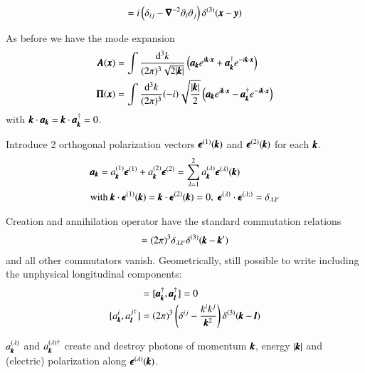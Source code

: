 \begin{align}
	[A_i(\pmb{x}), \Pi_j(\pmb{y})] = i \left( \delta_{ij} - \vecnab^{-2}\partial_i \partial_j \right) \delta^{(3)} (\pmb{x} - \pmb{y})
\end{align}

As before we have the mode expansion
\begin{align*}
	\pmb{A}(\pmb{x}) &= \int \frac{\dd^3 k}{(2\pi)^3\sqrt{2|\pmb{k}|}} \left( \pmb{a}_{\pmb{k}}e^{i\pmb{k}\cdot\pmb{x}} + \pmb{a}^\dagger_{\pmb{k}} e^{-i\pmb{k}\cdot\pmb{x}} \right) \\
	\pmb{\Pi}(\pmb{x}) &= \int \frac{\dd^3 k}{(2\pi)^3} (-i)\sqrt{\frac{|\pmb{k}|}{2}}\left( \pmb{a}_{\pmb{k}}e^{i\pmb{k}\cdot\pmb{x}} - \pmb{a}^\dagger_{\pmb{k}} e^{-i\pmb{k}\cdot\pmb{x}} \right) \\
\end{align*}
with $\pmb{k}\cdot\pmb{a}_{\pmb{k}} = \pmb{k}\cdot\pmb{a}^\dagger_{\pmb{k}} = 0$.

Introduce 2 orthogonal polarization vectors $\pmb{\epsilon}^{(1)}(\pmb{k})$ and $\pmb{\epsilon}^{(2)}(\pmb{k})$ for each $\pmb{k}$.
\begin{align*}
	&\pmb{a}_{\pmb{k}} = a_{\pmb{k}}^{(1)}\pmb{\epsilon}^{(1)} + a_{\pmb{k}}^{(2)}\pmb{\epsilon}^{(2)} = \sum_{\lambda=1}^2 a_{\pmb{k}}^{(\lambda)}\pmb{\epsilon}^{(\lambda)}(\pmb{k}) \\
	& \text{with } \pmb{k}\cdot\pmb{\epsilon}^{(1)}(\pmb{k}) = \pmb{k}\cdot\pmb{\epsilon}^{(2)}(\pmb{k}) = 0,\; \pmb{\epsilon}^{(\lambda)}\cdot \pmb{\epsilon}^{(\lambda;)}=\delta_{\lambda \lambda'}
\end{align*}

Creation and annihilation operator have the standard commutation relations
\begin{align}
	[a_{\veck}^{(\lambda)}, a_{\veck'}^{(\lambda')\dagger}] = (2\pi)^3 \delta_{\lambda\lambda'}\delta^{(3)}(\veck-\veck')
\end{align} 
and all other commutators vanish. Geometrically, still possible to write including the unphysical longitudinal components:
\begin{align*}
	[\pmb{a}_{\veck}, \pmb{a}_{\pmb{l}}] &= 	[\pmb{a}_{\veck}^\dagger, \pmb{a}_{\pmb{l}}^\dagger] = 0 \\
	[a^i_{\veck}, a_{\pmb{l}}^{j\dagger}] &= (2\pi)^3 \left( \delta^{ij} - \frac{k^i k^j}{\veck^2} \right) \delta^{(3)}(\veck-\pmb{l})
\end{align*}

$a_{\pmb{k}}^{(\lambda)}$ and $a_{\pmb{k}}^{(\lambda)\dagger}$ create and destroy photons of momentum $\pmb{k}$, energy $|\pmb{k}|$ and (electric) polarization along $\pmb{\epsilon}^{(\lambda)}(\pmb{k})$. 


